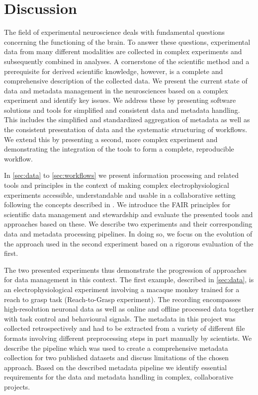 \cleardoublepage
\chapter{Discussion}
\label{sec:discussion}

The field of experimental neuroscience deals with fundamental questions concerning the functioning of the brain. To answer these questions, experimental data from many different modalities are collected in complex experiments and subsequently combined in analyses. A cornerstone of the scientific method and a prerequisite for derived scientific knowledge, however, is a complete and comprehensive description of the collected data. We present the current state of data and metadata management in the neurosciences based on a complex experiment and identify key issues. We address these by presenting software solutions and tools for simplified and consistent data and metadata handling. This includes the simplified and standardized aggregation of metadata as well as the consistent presentation of data and the systematic structuring of workflows. We extend this by presenting a second, more complex experiment and demonstrating the integration of the tools to form a complete, reproducible workflow.

In \cref{sec:data} to \cref{sec:workflows} we present information processing and related tools and principles in the context of making complex electrophysiological experiments accessible, understandable and usable in a collaborative setting following the concepts described in \citet{Zehl_2016, Zehl_2018}. We introduce the FAIR principles for scientific data management and stewardship and evaluate the presented tools and approaches based on these. We describe two experiments and their corresponding data and metadata processing pipelines. In doing so, we focus on the evolution of the approach used in the second experiment based on a rigorous evaluation of the first.

The two presented experiments thus demonstrate the progression of approaches for data management in this context. The first example, described in \cref{sec:data}, is an electrophysiological experiment involving a macaque monkey trained for a reach to grasp task (Reach-to-Grasp experiment). The recording encompasses high-resolution neuronal data as well as online and offline processed data together with task control and behavioural signals. The metadata in this project was collected retrospectively and had to be extracted from a variety of different file formats involving different preprocessing steps in part manually by scientists. We describe the pipeline which was used to create a comprehensive metadata collection for two published datasets and discuss limitations of the chosen approach. Based on the described metadata pipeline we identify essential requirements for the data and metadata handling in complex, collaborative projects.

